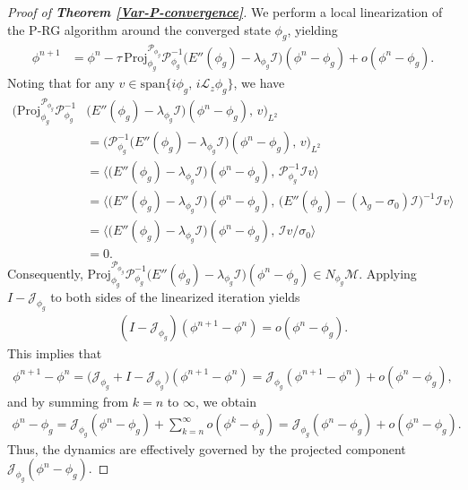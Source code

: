\documentclass[preprint,3p]{elsarticle}
\begin{document}
\begin{proof}[Proof of {\bf Theorem \ref{Var-P-convergence}}]
	{We perform a local linearization of the P-RG algorithm around the converged state $\phi_g$, yielding
		\begin{align*}
			\phi^{n+1} 
			&= \phi^n - \tau\, \mathrm{Proj}^{\mathcal{P}_{\phi_g}}_{\phi_g} \mathcal{P}_{\phi_g}^{-1}\big(E''(\phi_g)-\lambda_{\phi_g}\mathcal{I}\big)(\phi^n - \phi_g) + o(\phi^n - \phi_g).
		\end{align*}
		Noting that for any $v \in \mathrm{span}\{i\phi_g,\, i\mathcal{L}_z\phi_g\}$, we have
		\begin{align*}
			\Big(\mathrm{Proj}^{\mathcal{P}_{\phi_g}}_{\phi_g} \mathcal{P}_{\phi_g}^{-1}&\big(E''(\phi_g)-\lambda_{\phi_g}\mathcal{I}\big)(\phi^n - \phi_g),\, v\Big)_{L^2}\\
			&= \Big(\mathcal{P}_{\phi_g}^{-1}\big(E''(\phi_g)-\lambda_{\phi_g}\mathcal{I}\big)(\phi^n - \phi_g),\, v\Big)_{L^2} \\
			&= \Big\langle \big(E''(\phi_g)-\lambda_{\phi_g}\mathcal{I}\big)(\phi^n - \phi_g),\, \mathcal{P}_{\phi_g}^{-1}\mathcal{I} v \Big\rangle \\
			&= \Big\langle \big(E''(\phi_g)-\lambda_{\phi_g}\mathcal{I}\big)(\phi^n - \phi_g),\, \big(E''(\phi_g)-(\lambda_g-\sigma_0)\mathcal{I}\big)^{-1}\mathcal{I} v \Big\rangle\\
			&= \Big\langle \big(E''(\phi_g)-\lambda_{\phi_g}\mathcal{I}\big)(\phi^n - \phi_g),\, \mathcal{I} v/\sigma_0 \Big\rangle\\
			&= 0.
		\end{align*}
		Consequently,
		$
		\mathrm{Proj}^{\mathcal{P}_{\phi_g}}_{\phi_g} \mathcal{P}_{\phi_g}^{-1}\big(E''(\phi_g)-\lambda_{\phi_g}\mathcal{I}\big)(\phi^n - \phi_g) \in N_{\phi_g}\mathcal{M}.
		$
		Applying $I - \mathcal{J}_{\phi_g}$ to both sides of the linearized iteration yields
		\begin{align*}
			(I - \mathcal{J}_{\phi_g})(\phi^{n+1} - \phi^n) = o(\phi^n - \phi_g).
		\end{align*}
		This implies that
		\begin{align*}
			\phi^{n+1} - \phi^n 
			= \big(\mathcal{J}_{\phi_g} + I - \mathcal{J}_{\phi_g}\big)(\phi^{n+1} - \phi^n) = \mathcal{J}_{\phi_g}(\phi^{n+1} - \phi^n) + o(\phi^n - \phi_g),
		\end{align*}
		and by summing from $k = n$ to $\infty$, we obtain
		\begin{align*}
			\phi^n - \phi_g 
			= \mathcal{J}_{\phi_g}(\phi^n - \phi_g) + \sum_{k=n}^{\infty} o(\phi^k - \phi_g) 
			= \mathcal{J}_{\phi_g}(\phi^n - \phi_g) + o(\phi^n - \phi_g).
		\end{align*}
		Thus, the dynamics are effectively governed by the projected component $\mathcal{J}_{\phi_g}(\phi^n - \phi_g)$.}
		

\end{proof}
\end{document}
